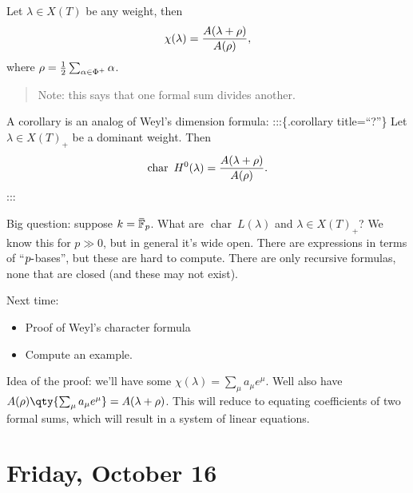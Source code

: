 \begin{theorem}

\begin{theorem}

Let \(\lambda \in X(T)\) be any weight, then
\begin{align*}   \chi(\lambda) = { A(\lambda + \rho) \over A(\rho) } ,\end{align*}
where \(\rho = {1\over 2} \sum_{\alpha \in \Phi^+} \alpha\).

\end{theorem}

\end{theorem}

\begin{quote}
Note: this says that one formal sum divides another.
\end{quote}

A corollary is an analog of Weyl's dimension formula: :::\{.corollary
title=``?''\} Let \(\lambda \in X(T)_+\) be a dominant weight. Then
\begin{align*}   \operatorname{char}~H^0(\lambda) = { A(\lambda + \rho) \over A(\rho) } .\end{align*}
:::

Big question: suppose
\(k = \mkern 1.5mu\overline{\mkern-1.5mu{\mathbb{F}}\mkern-1.5mu}\mkern 1.5mu_p\).
What are \(\operatorname{char}~L(\lambda)\) and \(\lambda \in X(T)_+\)?
We know this for \(p\gg 0\), but in general it's wide open. There are
expressions in terms of ``\(p{\hbox{-}}\)bases'', but these are hard to
compute. There are only recursive formulas, none that are closed (and
these may not exist).

Next time:

\begin{itemize}
\tightlist
\item
  Proof of Weyl's character formula
\item
  Compute an example.
\end{itemize}

Idea of the proof: we'll have some
\(\chi(\lambda) = \sum_\mu a_\mu e^\mu\). Well also have
\(A(\rho) \qty{ \sum_\mu a_\mu e^\mu } = A(\lambda + \rho)\). This will
reduce to equating coefficients of two formal sums, which will result in
a system of linear equations.

\hypertarget{friday-october-16}{%
\section{Friday, October 16}\label{friday-october-16}}

